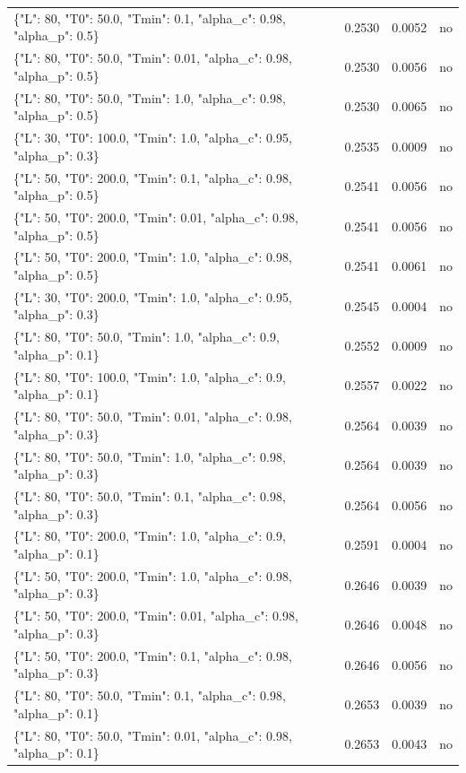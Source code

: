 \begin{table}[htbp]
\begin{tabular}{lrrr}
\{"L": 80, "T0": 50.0, "Tmin": 0.1, "alpha\_c": 0.98, "alpha\_p": 0.5\} & 0.2530 & 0.0052 & no \\
\{"L": 80, "T0": 50.0, "Tmin": 0.01, "alpha\_c": 0.98, "alpha\_p": 0.5\} & 0.2530 & 0.0056 & no \\
\{"L": 80, "T0": 50.0, "Tmin": 1.0, "alpha\_c": 0.98, "alpha\_p": 0.5\} & 0.2530 & 0.0065 & no \\
\{"L": 30, "T0": 100.0, "Tmin": 1.0, "alpha\_c": 0.95, "alpha\_p": 0.3\} & 0.2535 & 0.0009 & no \\
\{"L": 50, "T0": 200.0, "Tmin": 0.1, "alpha\_c": 0.98, "alpha\_p": 0.5\} & 0.2541 & 0.0056 & no \\
\{"L": 50, "T0": 200.0, "Tmin": 0.01, "alpha\_c": 0.98, "alpha\_p": 0.5\} & 0.2541 & 0.0056 & no \\
\{"L": 50, "T0": 200.0, "Tmin": 1.0, "alpha\_c": 0.98, "alpha\_p": 0.5\} & 0.2541 & 0.0061 & no \\
\{"L": 30, "T0": 200.0, "Tmin": 1.0, "alpha\_c": 0.95, "alpha\_p": 0.3\} & 0.2545 & 0.0004 & no \\
\{"L": 80, "T0": 50.0, "Tmin": 1.0, "alpha\_c": 0.9, "alpha\_p": 0.1\} & 0.2552 & 0.0009 & no \\
\{"L": 80, "T0": 100.0, "Tmin": 1.0, "alpha\_c": 0.9, "alpha\_p": 0.1\} & 0.2557 & 0.0022 & no \\
\{"L": 80, "T0": 50.0, "Tmin": 0.01, "alpha\_c": 0.98, "alpha\_p": 0.3\} & 0.2564 & 0.0039 & no \\
\{"L": 80, "T0": 50.0, "Tmin": 1.0, "alpha\_c": 0.98, "alpha\_p": 0.3\} & 0.2564 & 0.0039 & no \\
\{"L": 80, "T0": 50.0, "Tmin": 0.1, "alpha\_c": 0.98, "alpha\_p": 0.3\} & 0.2564 & 0.0056 & no \\
\{"L": 80, "T0": 200.0, "Tmin": 1.0, "alpha\_c": 0.9, "alpha\_p": 0.1\} & 0.2591 & 0.0004 & no \\
\{"L": 50, "T0": 200.0, "Tmin": 1.0, "alpha\_c": 0.98, "alpha\_p": 0.3\} & 0.2646 & 0.0039 & no \\
\{"L": 50, "T0": 200.0, "Tmin": 0.01, "alpha\_c": 0.98, "alpha\_p": 0.3\} & 0.2646 & 0.0048 & no \\
\{"L": 50, "T0": 200.0, "Tmin": 0.1, "alpha\_c": 0.98, "alpha\_p": 0.3\} & 0.2646 & 0.0056 & no \\
\{"L": 80, "T0": 50.0, "Tmin": 0.1, "alpha\_c": 0.98, "alpha\_p": 0.1\} & 0.2653 & 0.0039 & no \\
\{"L": 80, "T0": 50.0, "Tmin": 0.01, "alpha\_c": 0.98, "alpha\_p": 0.1\} & 0.2653 & 0.0043 & no \\

\end{tabular}
\end{table}
